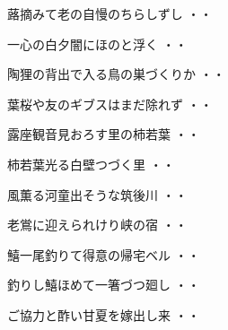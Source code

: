 \vspace{0.6cm}
\begin{shiika}蕗摘みて老の自慢のちらしずし
\hfill{・・}\end{shiika}
\vspace{0.6cm}
\begin{shiika}一心の白夕闇にほのと浮く
\hfill{・・}\end{shiika}
\vspace{0.6cm}
\begin{shiika}陶狸の背出で入る鳥の巣づくりか
\hfill{・・}\end{shiika}
\vspace{0.6cm}
\begin{shiika}葉桜や友のギブスはまだ除れず
\hfill{・・}\end{shiika}
\vspace{0.6cm}
\begin{shiika}露座観音見おろす里の柿若葉
\hfill{・・}\end{shiika}
\vspace{0.6cm}
\begin{shiika}柿若葉光る白壁つづく里
\hfill{・・}\end{shiika}
\vspace{0.6cm}
\begin{shiika}風薫る河童出そうな筑後川
\hfill{・・}\end{shiika}
\vspace{0.6cm}
\begin{shiika}老鴬に迎えられけり峡の宿
\hfill{・・}\end{shiika}
\vspace{0.6cm}
\begin{shiika}鱚一尾釣りて得意の帰宅ベル
\hfill{・・}\end{shiika}
\vspace{0.6cm}
\begin{shiika}釣りし鱚ほめて一箸づつ廻し
\hfill{・・}\end{shiika}
\vspace{0.6cm}
\begin{shiika}ご協力と酢い甘夏を嫁出し来
\hfill{・・}\end{shiika}
